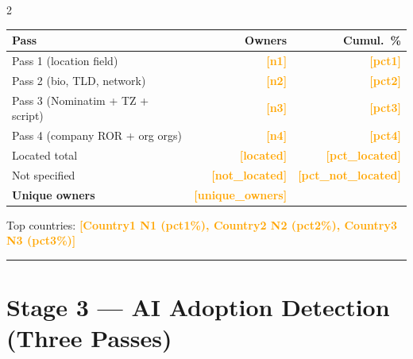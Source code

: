 \documentclass[10pt,a4paper]{article}
\newcommand{\FILLIN}[1]{\textcolor{orange}{\textbf{[#1]}}}
\begin{document}
\begin{multicols}{2}
\begin{tabular}{@{}lrr@{}}
\toprule
Pass & Owners & Cumul.\ \% \\
\midrule
Pass 1 (location field)            & \FILLIN{n1} & \FILLIN{pct1} \\
Pass 2 (bio, TLD, network)         & \FILLIN{n2} & \FILLIN{pct2} \\
Pass 3 (Nominatim + TZ + script)   & \FILLIN{n3} & \FILLIN{pct3} \\
Pass 4 (company ROR + org orgs)    & \FILLIN{n4} & \FILLIN{pct4} \\
\midrule
Located total              & \FILLIN{located}      & \FILLIN{pct\_located} \\
Not specified              & \FILLIN{not\_located} & \FILLIN{pct\_not\_located} \\
\textbf{Unique owners}     & \textbf{\FILLIN{unique\_owners}} & \\
\bottomrule
\end{tabular}

Top countries: \FILLIN{Country1 N1 (pct1\%), Country2 N2 (pct2\%), Country3 N3 (pct3\%)}

\end{multicols}


\vspace{6pt}
\hrule
\vspace{6pt}

\section*{Stage 3 --- AI Adoption Detection (Three Passes)}
\end{document}

